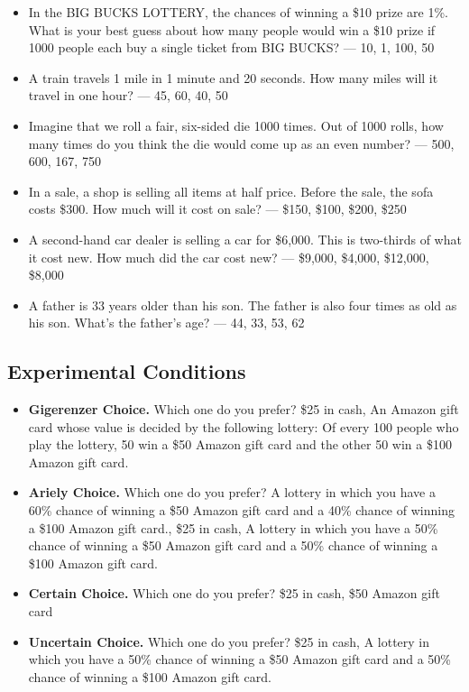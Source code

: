 \documentclass[12pt, letterpaper]{article}
\begin{document}
\begin{itemize}
    \item In the BIG BUCKS LOTTERY, the chances of winning a \$10 prize are 1\%. What is your best guess about how many people would win a \$10 prize if 1000 people each buy a single ticket from BIG BUCKS? — 10, 1, 100, 50
    
    \item A train travels 1 mile in 1 minute and 20 seconds. How many miles will it travel in one hour? — 45, 60, 40, 50
    
    \item Imagine that we roll a fair, six-sided die 1000 times. Out of 1000 rolls, how many times do you think the die would come up as an even number? — 500, 600, 167, 750
    
    \item In a sale, a shop is selling all items at half price. Before the sale, the sofa costs \$300. How much will it cost on sale? — \$150, \$100, \$200, \$250
    
    \item A second-hand car dealer is selling a car for \$6,000. This is two-thirds of what it cost new. How much did the car cost new? — \$9,000, \$4,000, \$12,000, \$8,000
    
    \item A father is 33 years older than his son. The father is also four times as old as his son. What's the father’s age? — 44, 33, 53, 62
\end{itemize}

\subsection{Experimental Conditions}

\begin{itemize}
    \item \textbf{Gigerenzer Choice.} Which one do you prefer? \$25 in cash, An Amazon gift card whose value is decided by the following lottery: Of every 100 people who play the lottery, 50 win a \$50 Amazon gift card and the other 50 win a \$100 Amazon gift card.
    
    \item \textbf{Ariely Choice.} Which one do you prefer? A lottery in which you have a 60\% chance of winning a \$50 Amazon gift card and a 40\% chance of winning a \$100 Amazon gift card., \$25 in cash,  A lottery in which you have a 50\% chance of winning a \$50 Amazon gift card and a 50\% chance of winning a \$100 Amazon gift card.

    \item \textbf{Certain Choice.} Which one do you prefer? \$25 in cash, \$50 Amazon gift card
    
    \item \textbf{Uncertain Choice.} Which one do you prefer? \$25 in cash, A lottery in which you have a 50\% chance of winning a \$50 Amazon gift card and a 50\% chance of winning a \$100 Amazon gift card.
\end{itemize}
\end{document}
